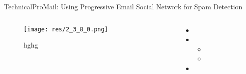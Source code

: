 \begin{frame}{Technical}{ProMail: Using Progressive Email Social Network for Spam Detection \cite{tseng_promail_2007}}

	\begin{columns}
		\begin{column}{0.7\textwidth}
			\begin{center}
			
				\begin{figure}
					\texttt{[image: res/2\_3\_8\_0.png]}
					\caption{\label{fig:2_3_8_0}hghg}
				\end{figure}
				
			\end{center}
		\end{column}
		
		\begin{column}{0.3\textwidth}
		
			\begin{itemize}
				\item 
				
				\item 
					\begin{itemize}
						\item 
						\item 
					\end{itemize}
				
				\item 
			\end{itemize}
			
		\end{column}
	\end{columns}
	

\end{frame}

